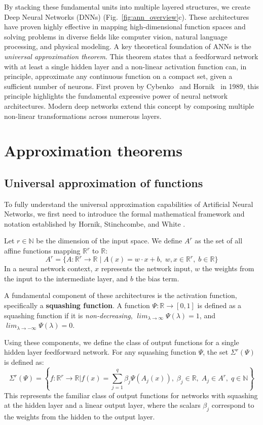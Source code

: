 By stacking these fundamental units into multiple layered structures, we create Deep Neural Networks (DNNs) (Fig.~\ref{fig:ann_overview}c). These architectures have proven highly effective in mapping high-dimensional function spaces and solving problems in diverse fields like computer vision, natural language processing, and physical modeling. A key theoretical foundation of ANNs is the \textit{universal approximation theorem}. This theorem states that a feedforward network with at least a single hidden layer and a non-linear activation function can, in principle, approximate any continuous function on a compact set, given a sufficient number of neurons. First proven by Cybenko~\cite{cybenko1989approximation} and Hornik~\cite{hornik1989multilayer} in 1989, this principle highlights the fundamental expressive power of neural network architectures. Modern deep networks extend this concept by composing multiple non-linear transformations across numerous layers.

\section{Approximation theorems}
\subsection{Universal approximation of functions}
To fully understand the universal approximation capabilities of Artificial Neural Networks, we first need to introduce the formal mathematical framework and notation established by Hornik, Stinchcombe, and White \cite{hornik1989multilayer}. 

Let $r \in \mathbb{N}$ be the dimension of the input space. We define $A^r$ as the set of all affine functions mapping $\mathbb{R}^r$ to $\mathbb{R}$:
$$ A^r = \{ A: \mathbb{R}^r \to \mathbb{R} \mid A(x) = w \cdot x + b, \; w, x \in \mathbb{R}^r, \; b \in \mathbb{R} \} $$
In a neural network context, $x$ represents the network input, $w$ the weights from the input to the intermediate layer, and $b$ the bias term.

A fundamental component of these architectures is the activation function, specifically a \textbf{squashing function}. A function $\Psi: \mathbb{R} \to [0, 1]$ is defined as a squashing function if it is \textit{non-decreasing}, $ \mathit{\lim_{\lambda \to \infty} \Psi(\lambda) = 1}$, and $\mathit{\lim_{\lambda \to -\infty} \Psi(\lambda) = 0}$.

Using these components, we define the class of output functions for a single hidden layer feedforward network. For any squashing function $\Psi$, the set $\Sigma^r(\Psi)$ is defined as:
$$ \Sigma^r(\Psi) = \left\{ f: \mathbb{R}^r \to \mathbb{R} \mathrel{\Big|} f(x) = \sum_{j=1}^q \beta_j \Psi(A_j(x)), \; \beta_j \in \mathbb{R}, \; A_j \in A^r, \; q \in \mathbb{N} \right\} $$
This represents the familiar class of output functions for networks with squashing at the hidden layer and a linear output layer, where the scalars $\beta_j$ correspond to the weights from the hidden to the output layer.

